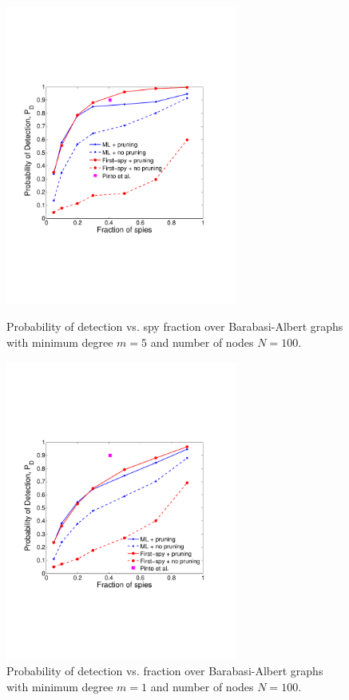 \begin{figure}[ht] \label{ fig7} 
  \begin{minipage}[b]{0.48\linewidth}
    \includegraphics[width=3in]{figures/ba_graphs} 
    \caption{Probability of detection vs. spy fraction over Barabasi-Albert graphs with minimum degree $m=5$ and number of nodes $N=100$.} 
\label{fig:ba_graph}
  \end{minipage} 
\hfill
\begin{minipage}[b]{0.48\linewidth}
    \includegraphics[width=3in]{figures/ba_graphs_p1} 
    \caption{Probability of detection vs. fraction over Barabasi-Albert graphs with minimum degree $m=1$ and number of nodes $N=100$.} 
\label{fig:ba_graph_p1}
  \end{minipage}

\end{figure}
